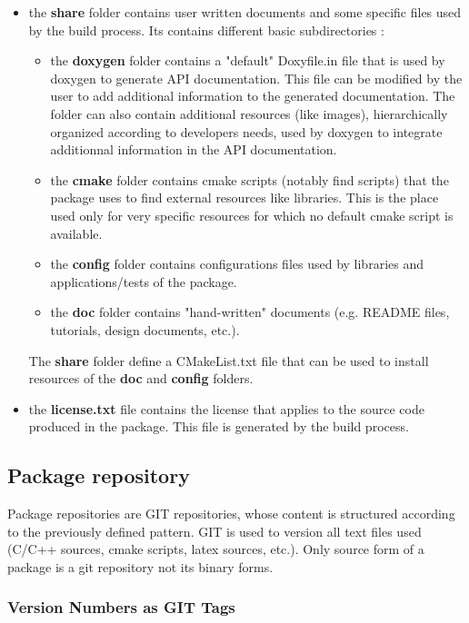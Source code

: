 \documentclass[12pt,a4paper]{article}
\begin{document}
\begin{itemize}
\item the \textbf{share} folder contains user written documents and some specific files used by the build process. Its contains different basic subdirectories :
\begin{itemize}
\item the \textbf{doxygen} folder contains a "default" Doxyfile.in file that is used by doxygen to generate API documentation. This file can be modified by the user to add additional information to the generated documentation. The folder can also contain additional resources (like images), hierarchically organized according to developers needs, used by doxygen to integrate additionnal information in the API documentation.
\item the \textbf{cmake} folder contains cmake scripts (notably find scripts) that the package uses to find external resources like libraries. This is the place used only for very specific resources for which no default cmake script is available.
\item the \textbf{config} folder contains configurations files used by libraries and applications/tests of the package.
\item the \textbf{doc} folder contains "hand-written" documents (e.g. README files, tutorials, design documents, etc.).
\end{itemize}
The \textbf{share} folder define a CMakeList.txt file that can be used to install resources of the \textbf{doc} and \textbf{config} folders.
\item the \textbf{license.txt} file contains the license that applies to the source code produced in the package. This file is generated by the build process.
\end{itemize}

\pagebreak

\subsection{Package repository}

Package repositories are GIT repositories, whose content is structured according to the previously defined pattern. GIT is used to version all text files used (C/C++ sources, cmake scripts, latex sources, etc.). Only source form of a package is a git repository not its binary forms.

\subsubsection{Version Numbers as GIT Tags}
\label{sec:versiontags}
\end{document}
